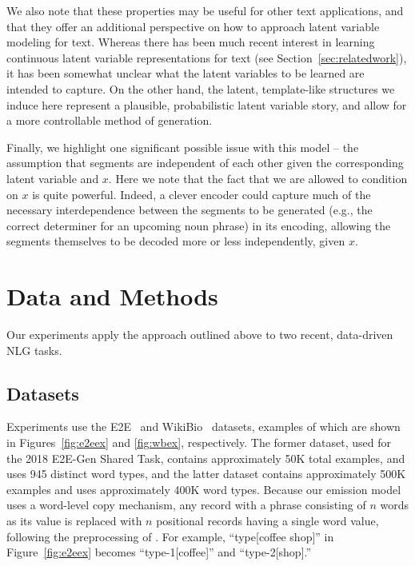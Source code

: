 \documentclass[11pt,a4paper]{article}
\begin{document}
We also note that these properties may be useful for other text applications, and that they offer an additional perspective on how to approach latent variable modeling for text. Whereas there has been much recent interest in learning continuous latent variable representations for text (see Section~\ref{sec:relatedwork}), it has been somewhat unclear what the latent variables to be learned are intended to capture. On the other hand, the latent, template-like structures we induce here represent a plausible, probabilistic latent variable story, and allow for a more controllable method of generation. 

Finally, we highlight one significant possible issue with this model -- the assumption that segments are independent of each other given the corresponding latent variable and $x$. Here we note that the fact that we are allowed to condition on $x$ is quite powerful. Indeed, a clever encoder could capture much of the necessary interdependence between the segments to be generated (e.g., the correct determiner for an upcoming noun phrase) in its encoding, allowing the segments themselves to be decoded more or less independently, given $x$. 

\section{Data and Methods}

Our experiments apply the approach outlined above to two recent, data-driven NLG tasks. %


\subsection{Datasets}
\label{sec:datasets}
Experiments use the E2E~\citep{novikova2017e2e} and WikiBio~\citep{lebret2016neural} datasets, examples of which are shown in Figures~\ref{fig:e2eex} and \ref{fig:wbex}, respectively. The former dataset, used for the 2018 E2E-Gen Shared Task, contains approximately 50K total examples, and uses 945 distinct word types, and the latter dataset contains approximately 500K examples and uses approximately 400K word types. Because our emission model uses a word-level copy mechanism, any record with a phrase consisting of $n$ words as its value is replaced with $n$ positional records having a single word value, following the preprocessing of \citet{lebret2016neural}. For example, ``type[coffee shop]'' in Figure~\ref{fig:e2eex} becomes ``type-1[coffee]'' and ``type-2[shop].''
\end{document}
